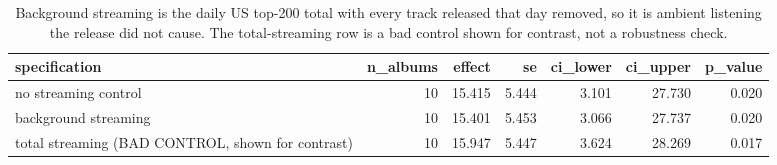 \begin{table}
\caption{Background streaming is the daily US top-200 total with every track released that day removed, so it is ambient listening the release did not cause. The total-streaming row is a bad control shown for contrast, not a robustness check.}
\begin{tabular}{lrrrrrr}
\toprule
specification & n\_albums & effect & se & ci\_lower & ci\_upper & p\_value \\
\midrule
no streaming control & 10 & 15.415 & 5.444 & 3.101 & 27.730 & 0.020 \\
background streaming & 10 & 15.401 & 5.453 & 3.066 & 27.737 & 0.020 \\
total streaming (BAD CONTROL, shown for contrast) & 10 & 15.947 & 5.447 & 3.624 & 28.269 & 0.017 \\
\bottomrule
\end{tabular}
\end{table}
